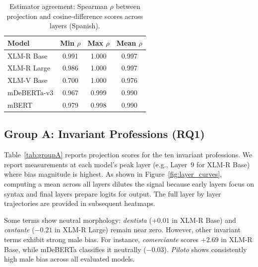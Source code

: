 \documentclass[english, a4paper, 11.5pt, twoside]{article}
\begin{document}
\begin{table}[!htbp]
\centering
\caption{Estimator agreement: Spearman $\rho$ between projection and cosine-difference scores across layers (Spanish).}
\label{tab:spearman}
\begin{tabular}{lccc}
\toprule
\textbf{Model} & \textbf{Min $\rho$} & \textbf{Max $\rho$} & \textbf{Mean $\rho$} \\
\midrule
XLM-R Base     & 0.991 & 1.000 & 0.997 \\
XLM-R Large    & 0.986 & 1.000 & 0.997 \\
XLM-V Base     & 0.700 & 1.000 & 0.976 \\
mDeBERTa-v3    & 0.967 & 0.999 & 0.990 \\
mBERT          & 0.979 & 0.998 & 0.990 \\     
\bottomrule
\end{tabular}
\end{table}

\subsection{Group A: Invariant Professions (RQ1)}

Table~\ref{tab:groupA} reports projection scores for the ten invariant professions. We report measurements at each model's peak layer (e.g., Layer~9 for XLM-R Base) where bias magnitude is highest. As shown in Figure~\ref{fig:layer_curves}, computing a mean across all layers dilutes the signal because early layers focus on syntax and final layers prepare logits for output. The full layer by layer trajectories are provided in subsequent heatmaps.

Some terms show neutral morphology: \textit{dentista} ($+0.01$ in XLM-R Base) and \textit{cantante} ($-0.21$ in XLM-R Large) remain near zero. However, other invariant terms exhibit strong male bias. For instance, \textit{comerciante} scores $+2.69$ in XLM-R Base, while mDeBERTa classifies it neutrally ($-0.03$). \textit{Piloto} shows consistently high male bias across all evaluated models.
\end{document}
